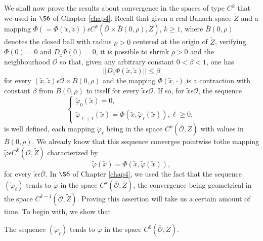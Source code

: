 We shall now prove the results about convergence in the spaces of type
$C^{k}$ that we used in $\S 6$ of Chapter \ref{chap4}. Recall that
given a real Banach space $\widetilde{Z}$ and a mapping $\Phi(= \Phi
(\widetilde{x}, \widetilde{z})) \epsilon C^{k} (\overline{\mathscr{O}}
\times \overline{B} (0, \rho), \widetilde{Z})$, $k \geq 1$, where
$\overline{B}(0, \rho)$ denotes the closed ball with radius $\rho > 0$
centered at the origin of $\widetilde{Z}$, verifying $\Phi(0) = 0$ and
$D_{\widetilde{z}}\Phi(0) = 0$, it is possible to shrink $\rho > 0$
and the neighbourhood $\mathscr{O}$ so that, given any arbitrary
constant $0 < \beta < 1$, one has
\begin{equation*}
||D_{\widetilde{z}} \Phi(\widetilde{x}, \widetilde{z})|| \leq \beta\tag{A2.25}\label{app-2-eqA2.25}
\end{equation*}
for every $(\widetilde{x}, \widetilde{z}) \epsilon
\overline{\mathscr{O}} \times \overline{B}(0, \rho)$ and the mapping
$\Phi(\widetilde{x}, \cdot)$ is a contraction with constant $\beta$
from $\overline{B}(0, \rho)$ to itself for every $\widetilde{x}
\epsilon \overline{\mathscr{O}}$. If so, for $\widetilde{x} \epsilon
\overline{\mathscr{O}}$, the sequence
\begin{equation*}
\begin{cases}
\widetilde{\varphi}_{0} (\widetilde{x}) = 0,\\
\widetilde{\varphi}_{\ell + 1} (\widetilde{x}) = \Phi(\widetilde{x},
\widetilde{\varphi}_{\ell} (\widetilde{x})), \ell \geq 0,
\end{cases}
\end{equation*}
is well defined, each mapping $\widetilde{\varphi}_{\ell}$ being in
the space $C^{k}(\overline{\mathscr{O}}, \widetilde{Z})$ with values
in $\overline{B}(0, \rho)$. We already know that this sequence
converges pointwise to\pageoriginale the mapping $\widetilde{\varphi}
\epsilon C^{k} (\overline{\mathscr{O}}, \widetilde{Z})$ characterized
by
$$
\widetilde{\varphi} (\widetilde{x}) = \Phi(\widetilde{x},
\widetilde{\varphi}(\widetilde{x})), 
$$
for every $\widetilde{x} \epsilon \overline{\mathscr{O}}$. In $\S 6$
of Chapter \ref{chap4}, we used the fact that the sequence
$(\widetilde{\varphi}_{\ell})$ tends to $\widetilde{\varphi}$ in the
space $C^{k}(\overline{\mathscr{O}}, \widetilde{Z})$, the convergence
being geometrical in the space $C^{k-1} (\overline{\mathscr{O}},
\widetilde{Z})$. Proving this assertion will take us a certain amount
of time. To begin with, we show that


\begin{alphlemma}\label{app-2-lemA2.2}%
The sequence $(\widetilde{\varphi}_{\ell})$ tends to
$\widetilde{\varphi}$ in the space $C^{0} (\overline{\mathscr{O}},
\widetilde{Z})$. 
\end{alphlemma}

